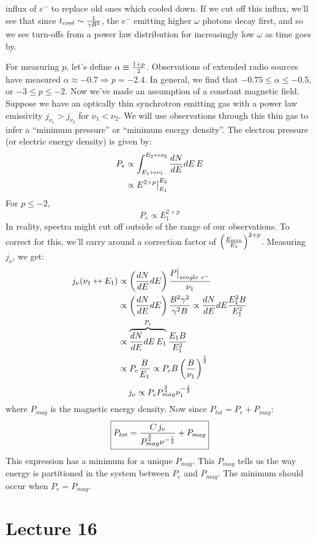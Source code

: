 \documentclass[11pt]{article}
\def\hf{{1 \over 2}}
\def\imply{\Rightarrow}
\def\inv#1{{1 \over #1}}
\def\eval#1{\big|_{#1}}
\begin{document}
influx of $e^-$ to replace old ones which cooled down.  If we cut off this
influx, we'll see that since $t_{cool}\sim\inv{\gamma B^2}$, the $e^-$ emitting
higher $\omega$ photons decay first, and so we see turn-offs from a power law
distribution for increasingly low $\omega$ as time goes by.\par
For measuring $p$, let's define $\alpha\equiv{1+p\over2}$.
Observations of extended radio sources have measured $\alpha\approx-0.7
\imply p=-2.4$.  In general, we find that $-0.75\le\alpha\le-0.5$, or
$-3\le p\le -2$.  
Now we've made an assumption of a constant magnetic field.
Suppose we have an optically thin synchrotron emitting gas with a power law
emissivity
$j_{\nu_1}>j_{\nu_2}$ for $\nu_1<\nu_2$.  We will use observations through
this thin gas to infer a ``minimum pressure'' or ``minimum energy density''.  
The electron pressure (or electric energy density) is given by:
$$\begin{aligned}P_e&\propto\int_{E_1\leftrightarrow\nu_1}^{E_2\leftrightarrow\nu_2}
{{dN \over dE}dE\,E}\\ 
&\propto E^{2+p}\eval{E_1}^{E_2}\\ \end{aligned}$$
For $p\le-2$,
$$P_e\propto E_1^{2+p}$$
In reality, spectra might cut off outside of the range of our observations.
To correct for this, we'll carry around a correction factor of $\left({E_{min}
\over E_1}\right)^{2+p}$.  Measuring $j_\nu$, we get:
$$\begin{aligned}j_\nu(\nu_1\leftrightarrow E_1)&\propto\left({dN\over dE}dE\right){P
\eval{single\ e^-}\over\nu_1}\\ 
&\propto\left({dN\over dE}dE\right){B^2\gamma^2\over\gamma^2 B}
\propto{dN\over dE}dE{E_1^2B\over E_1^2}\\ 
&\propto\overbrace{{dN\over dE}dE\,E_1}^{P_e}{E_1B\over E_1^2}\\ 
&\propto P_e{B\over E_1}\propto P_eB\left({B\over\nu_1}\right)^\hf\\ \end{aligned}$$
$$j_\nu\propto P_eP_{mag}^{3\over4}\nu_1^{-\hf}$$
where $P_{mag}$ is the magnetic energy density.  
Now since $P_{tot}=P_e+P_{mag}$:
$$\boxed{P_{tot}={C\,j_\nu\over P_{mag}^{3\over4}\nu^{-\hf}}+P_{mag}}$$
This expression has a minimum for a unique $P_{mag}$.  This $P_{mag}$ tells
us the way energy is partitioned in the system between $P_e$ and $P_{mag}$.
The minimum should occur when $P_e=P_{mag}$.

\section*{ Lecture 16 }
\end{document}
